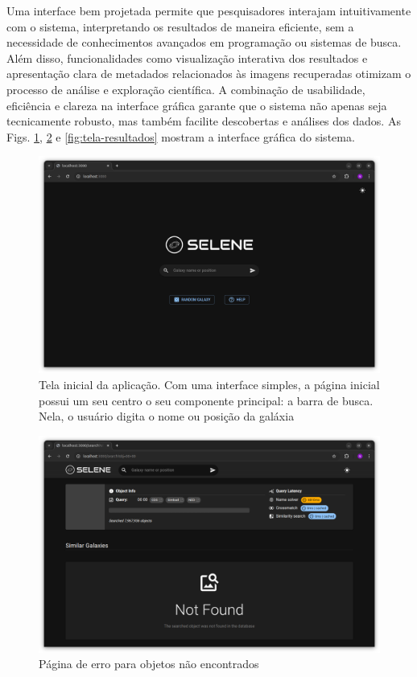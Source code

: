 Uma interface bem projetada permite que pesquisadores interajam intuitivamente com o sistema, interpretando os resultados de maneira eficiente, sem a necessidade de conhecimentos avançados em programação ou sistemas de busca. Além disso, funcionalidades como visualização interativa dos resultados e apresentação clara de metadados relacionados às imagens recuperadas otimizam o processo de análise e exploração científica. A combinação de usabilidade, eficiência e clareza na interface gráfica garante que o sistema não apenas seja tecnicamente robusto, mas também facilite descobertas e análises dos dados. As Figs. \ref{fig:tela-home}, \ref{fig:tela-erro} e \ref{fig:tela-resultados} mostram a interface gráfica do sistema.

\begin{figure}[!ht]
  \centering
  \includegraphics[width=\linewidth]{figures/screen-1.png}
  \caption{Tela inicial da aplicação. Com uma interface simples, a página inicial possui um seu centro o seu componente principal: a barra de busca. Nela, o usuário digita o nome ou posição da galáxia}
  \label{fig:tela-home}
\end{figure}

\begin{figure}[!ht]
  \centering
  \caption{Página de erro para objetos não encontrados}
  \label{fig:tela-erro}
  \includegraphics[width=\linewidth]{figures/screen-4.png}
\end{figure}



